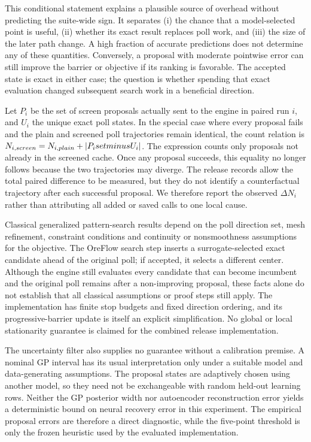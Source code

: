 \documentclass[10pt]{article}
\begin{document}
This conditional statement explains a plausible source of overhead without predicting the suite-wide sign. It separates (i) the chance that a model-selected point is useful, (ii) whether its exact result replaces poll work, and (iii) the size of the later path change. A high fraction of accurate predictions does not determine any of these quantities. Conversely, a proposal with moderate pointwise error can still improve the barrier or objective if its ranking is favorable. The accepted state is exact in either case; the question is whether spending that exact evaluation changed subsequent search work in a beneficial direction.

Let $P_i$ be the set of screen proposals actually sent to the engine in paired run $i$, and $U_i$ the unique exact poll states. In the special case where every proposal fails and the plain and screened poll trajectories remain identical, the count relation is $N_{i,screen}=N_{i,plain}+|P_i\\setminus U_i|$. The expression counts only proposals not already in the screened cache. Once any proposal succeeds, this equality no longer follows because the two trajectories may diverge. The release records allow the total paired difference to be measured, but they do not identify a counterfactual trajectory after each successful proposal. We therefore report the observed $\Delta N_i$ rather than attributing all added or saved calls to one local cause.

Classical generalized pattern-search results depend on the poll direction set, mesh refinement, constraint conditions and continuity or nonsmoothness assumptions for the objective. The OreFlow search step inserts a surrogate-selected exact candidate ahead of the original poll; if accepted, it selects a different center. Although the engine still evaluates every candidate that can become incumbent and the original poll remains after a non-improving proposal, these facts alone do not establish that all classical assumptions or proof steps still apply. The implementation has finite stop budgets and fixed direction ordering, and its progressive-barrier update is itself an explicit simplification. No global or local stationarity guarantee is claimed for the combined release implementation.

The uncertainty filter also supplies no guarantee without a calibration premise. A nominal GP interval has its usual interpretation only under a suitable model and data-generating assumptions. The proposal states are adaptively chosen using another model, so they need not be exchangeable with random held-out learning rows. Neither the GP posterior width nor autoencoder reconstruction error yields a deterministic bound on neural recovery error in this experiment. The empirical proposal errors are therefore a direct diagnostic, while the five-point threshold is only the frozen heuristic used by the evaluated implementation.
\end{document}
